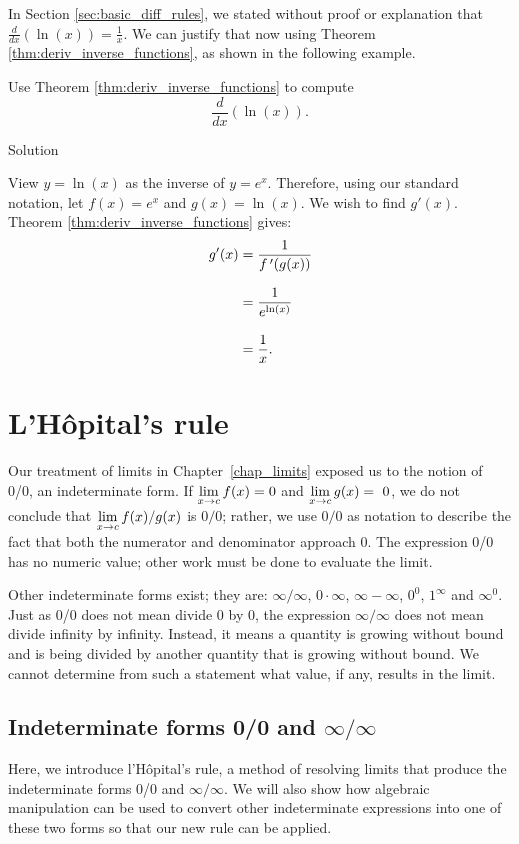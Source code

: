 \fi
\fi

In Section \ref{sec:basic_diff_rules}, we stated without proof or explanation that $\frac{d}{dx}\left(\ln (x)\right) = \frac{1}{x}$. We can justify that now using Theorem \ref{thm:deriv_inverse_functions}, as shown in the following example.

\begin{example}\label{ex_deriv_lnx}
Use Theorem \ref{thm:deriv_inverse_functions} to compute 
$$\dfrac{d}{dx}\left(\ln (x)\right).$$

Solution 

View $y= \ln (x)$ as the inverse of $y = e^x$. Therefore, using our standard notation, let $f(x) = e^x$ and $g(x) = \ln (x)$. We wish to find $g'(x)$. Theorem \ref{thm:deriv_inverse_functions} gives:
		\begin{align*}
		g'(x) &= \frac{1}{\fp(g(x))} \\[0.2cm]
					&=	\frac{1}{e^{\ln (x)}}\rule{0pt}{15pt} \\[0.2cm]
					&= \frac{1}{x}.\rule{0pt}{17pt}
		\end{align*}
\end{example}


\ifcourse
\section{L'H\^opital's rule}\label{sec:lhopitals_rule}

Our treatment of limits in Chapter~\ref{chap_limits} exposed us to the notion of 0/0, an indeterminate form. If $\displaystyle \lim_{x\to c}f(x)=0$ and $\displaystyle \lim_{x\to c} g(x) =~0$, we do not conclude that $\displaystyle \lim_{x\to c} f(x)/g(x)$ is $0/0$; rather, we use $0/0$ as notation to describe the fact that both the numerator and denominator approach 0. The expression 0/0 has no numeric value; other work must be done to evaluate the limit.

Other indeterminate forms exist; they are: %
 $\infty/\infty$, $0\cdot\infty$, $\infty-\infty$, $0^0$, $1^\infty$ and $\infty^0$. %
 Just as 0/0 does not mean divide 0 by 0, the expression $\infty/\infty$ does not mean divide infinity by infinity. Instead, it means a quantity is growing without bound and is being divided by another quantity that is growing without bound. We cannot determine from such a statement what value, if any, results in the limit. 


\subsection{Indeterminate forms 0/0 and $\infty/\infty$}
Here, we introduce l'H\^opital's rule, a method of resolving limits that produce the indeterminate forms 0/0 and $\infty/\infty$. We will also show how algebraic manipulation can be used to convert other indeterminate expressions into one of these two forms so that our new rule can be applied.

